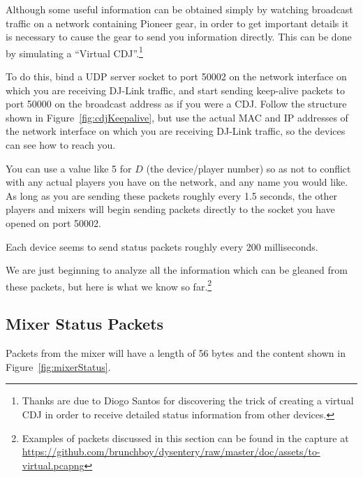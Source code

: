 \documentclass[11pt]{article}
\begin{document}
Although some useful information can be obtained simply by watching
broadcast traffic on a network containing Pioneer gear, in order to
get important details it is necessary to cause the gear to send you
information directly. This can be done by simulating a ``Virtual
CDJ''.\footnote{Thanks are due to Diogo Santos for discovering the
  trick of creating a virtual CDJ in order to receive detailed status
  information from other devices.}

To do this, bind a UDP server socket to port 50002 on the network
interface on which you are receiving DJ-Link traffic, and start
sending keep-alive packets to port 50000 on the broadcast address as
if you were a CDJ. Follow the structure shown in
Figure~\ref{fig:cdjKeepalive}, but use the actual MAC and IP addresses
of the network interface on which you are receiving DJ-Link traffic,
so the devices can see how to reach you.

You can use a value like 5 for $D$ (the device/player number) so
as not to conflict with any actual players you have on the network,
and any name you would like. As long as you are sending these packets
roughly every 1.5 seconds, the other players and mixers will begin
sending packets directly to the socket you have opened on port 50002.

Each device seems to send status packets roughly every 200 milliseconds.

We are just beginning to analyze all the information which can be
gleaned from these packets, but here is what we know so
far.\footnote{Examples of packets discussed in this section can be
  found in the capture at
  \url{https://github.com/brunchboy/dysentery/raw/master/doc/assets/to-virtual.pcapng}}

\subsection{Mixer Status Packets}

Packets from the mixer will have a length of 56 bytes and the content
shown in Figure~\ref{fig:mixerStatus}.
\end{document}
